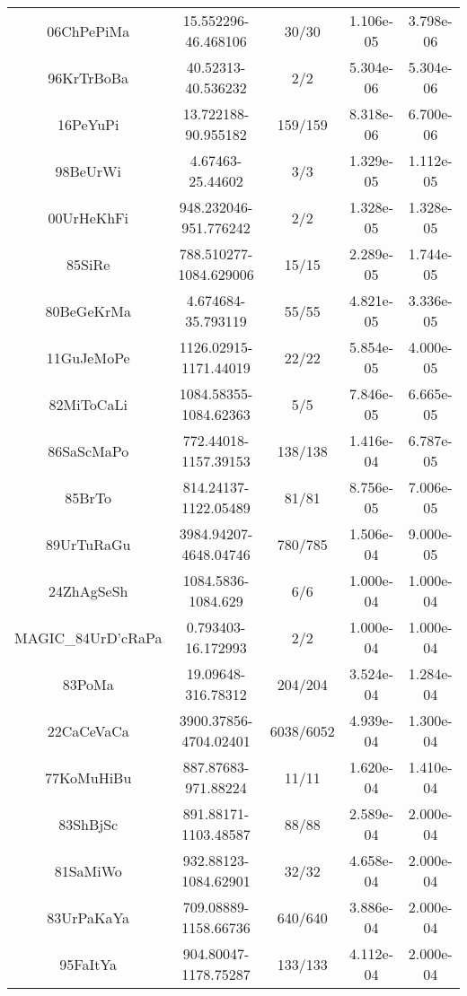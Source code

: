 \begin{longtable}{c c c c c}
06ChPePiMa \cite{06ChPePiMa} & 15.552296-46.468106 & 30/30 & 1.106e-05 & 3.798e-06 \\
96KrTrBoBa \cite{96KrTrBoBa} & 40.52313-40.536232 & 2/2 & 5.304e-06 & 5.304e-06 \\
16PeYuPi \cite{16PeYuPi} & 13.722188-90.955182 & 159/159 & 8.318e-06 & 6.700e-06 \\
98BeUrWi \cite{98BeUrWi} & 4.67463-25.44602 & 3/3 & 1.329e-05 & 1.112e-05 \\
00UrHeKhFi \cite{00UrHeKhFi} & 948.232046-951.776242 & 2/2 & 1.328e-05 & 1.328e-05 \\
85SiRe \cite{85SiRe} & 788.510277-1084.629006 & 15/15 & 2.289e-05 & 1.744e-05 \\
80BeGeKrMa \cite{80BeGeKrMa} & 4.674684-35.793119 & 55/55 & 4.821e-05 & 3.336e-05 \\
11GuJeMoPe \cite{11GuJeMoPe} & 1126.02915-1171.44019 & 22/22 & 5.854e-05 & 4.000e-05 \\
82MiToCaLi \cite{82MiToCaLi} & 1084.58355-1084.62363 & 5/5 & 7.846e-05 & 6.665e-05 \\
86SaScMaPo \cite{86SaScMaPo} & 772.44018-1157.39153 & 138/138 & 1.416e-04 & 6.787e-05 \\
85BrTo \cite{85BrTo} & 814.24137-1122.05489 & 81/81 & 8.756e-05 & 7.006e-05 \\
89UrTuRaGu \cite{89UrTuRaGu} & 3984.94207-4648.04746 & 780/785 & 1.506e-04 & 9.000e-05 \\
24ZhAgSeSh \cite{24ZhAgSeSh} & 1084.5836-1084.629 & 6/6 & 1.000e-04 & 1.000e-04 \\
MAGIC_84UrD'cRaPa \cite{MAGIC_84UrD'cRaPa} & 0.793403-16.172993 & 2/2 & 1.000e-04 & 1.000e-04 \\
83PoMa \cite{83PoMa} & 19.09648-316.78312 & 204/204 & 3.524e-04 & 1.284e-04 \\
22CaCeVaCa \cite{22CaCeVaCa} & 3900.37856-4704.02401 & 6038/6052 & 4.939e-04 & 1.300e-04 \\
77KoMuHiBu \cite{77KoMuHiBu} & 887.87683-971.88224 & 11/11 & 1.620e-04 & 1.410e-04 \\
83ShBjSc \cite{83ShBjSc} & 891.88171-1103.48587 & 88/88 & 2.589e-04 & 2.000e-04 \\
81SaMiWo \cite{81SaMiWo} & 932.88123-1084.62901 & 32/32 & 4.658e-04 & 2.000e-04 \\
83UrPaKaYa \cite{83UrPaKaYa} & 709.08889-1158.66736 & 640/640 & 3.886e-04 & 2.000e-04 \\
95FaItYa \cite{95FaItYa} & 904.80047-1178.75287 & 133/133 & 4.112e-04 & 2.000e-04 \\

\end{longtable}
